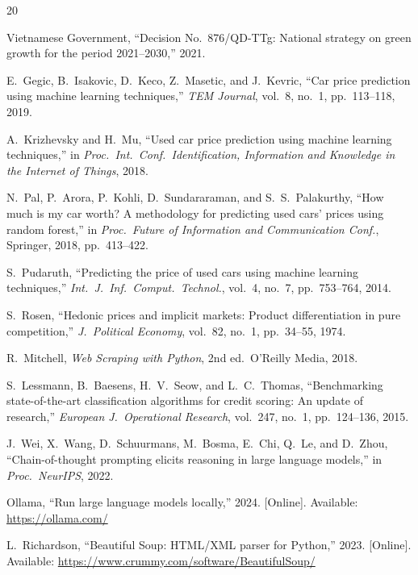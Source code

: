 \documentclass[lettersize,journal]{IEEEtran}
\begin{document}
\begin{thebibliography}{20}


Vietnamese Government, ``Decision No.\ 876/QD-TTg: National strategy on
green growth for the period 2021--2030,'' 2021.

E.~Gegic, B.~Isakovic, D.~Keco, Z.~Masetic, and J.~Kevric, ``Car price
prediction using machine learning techniques,'' \textit{TEM Journal},
vol.~8, no.~1, pp.~113--118, 2019.

A.~Krizhevsky and H.~Mu, ``Used car price prediction using machine
learning techniques,'' in \textit{Proc.\ Int.\ Conf.\ Identification,
Information and Knowledge in the Internet of Things}, 2018.

N.~Pal, P.~Arora, P.~Kohli, D.~Sundararaman, and S.~S.~Palakurthy,
``How much is my car worth? A methodology for predicting used cars' prices
using random forest,'' in \textit{Proc.\ Future of Information and
Communication Conf.}, Springer, 2018, pp.~413--422.

S.~Pudaruth, ``Predicting the price of used cars using machine learning
techniques,'' \textit{Int.\ J.\ Inf.\ Comput.\ Technol.}, vol.~4, no.~7,
pp.~753--764, 2014.

S.~Rosen, ``Hedonic prices and implicit markets: Product differentiation in
pure competition,'' \textit{J.\ Political Economy}, vol.~82, no.~1,
pp.~34--55, 1974.

R.~Mitchell, \textit{Web Scraping with Python}, 2nd ed.\ O'Reilly Media,
2018.

S.~Lessmann, B.~Baesens, H.~V.~Seow, and L.~C.~Thomas, ``Benchmarking
state-of-the-art classification algorithms for credit scoring: An update
of research,'' \textit{European J.\ Operational Research}, vol.~247, no.~1,
pp.~124--136, 2015.

J.~Wei, X.~Wang, D.~Schuurmans, M.~Bosma, E.~Chi, Q.~Le, and D.~Zhou,
``Chain-of-thought prompting elicits reasoning in large language models,''
in \textit{Proc.\ NeurIPS}, 2022.

Ollama, ``Run large language models locally,'' 2024. [Online]. Available:
\url{https://ollama.com/}

L.~Richardson, ``Beautiful Soup: HTML/XML parser for Python,'' 2023.
[Online]. Available: \url{https://www.crummy.com/software/BeautifulSoup/}


\end{thebibliography}
\end{document}

